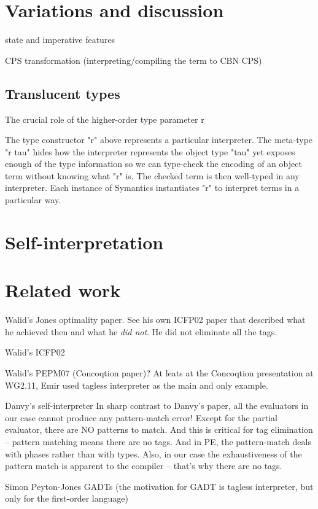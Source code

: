 \documentclass[preprint]{sigplanconf}
\begin{document}
\section{Variations and discussion}

state and imperative features

CPS transformation (interpreting/compiling the term to CBN CPS)

\subsection{Translucent types}
The crucial role of the higher-order type parameter r

The type constructor "r" above represents a particular interpreter.  The
meta-type "r tau" hides how the interpreter represents the object type
"tau" yet exposes enough of the type information so we can type-check
the encoding of an object term without knowing what "r" is.  The checked
term is then well-typed in any interpreter.  Each instance of Symantics
instantiates "r" to interpret terms in a particular way.

\section{Self-interpretation}



\section{Related work}
Walid's Jones optimality paper. See his own ICFP02 paper that
described what he achieved then and what he \emph{did not}. He did not
eliminate all the tags.

Walid's ICFP02

Walid's PEPM07 (Concoqtion paper)? At leats at the Concoqtion
presentation at WG2.11, Emir used tagless interpreter as the main and
only example.

Danvy's self-interpreter
In sharp contrast to Danvy's paper, all the evaluators in our case
cannot produce any pattern-match error! Except for the partial
evaluator, there are NO patterns to match. And this is critical for
tag elimination -- pattern matching means there are no tags. And in
PE, the pattern-match deals with phases rather than with types. Also,
in our case the exhaustiveness of the pattern match is apparent to the
compiler -- that's why there are no tags.

Simon Peyton-Jones GADTs (the motivation for GADT is tagless
interpreter, but only for the first-order language)
\end{document}
